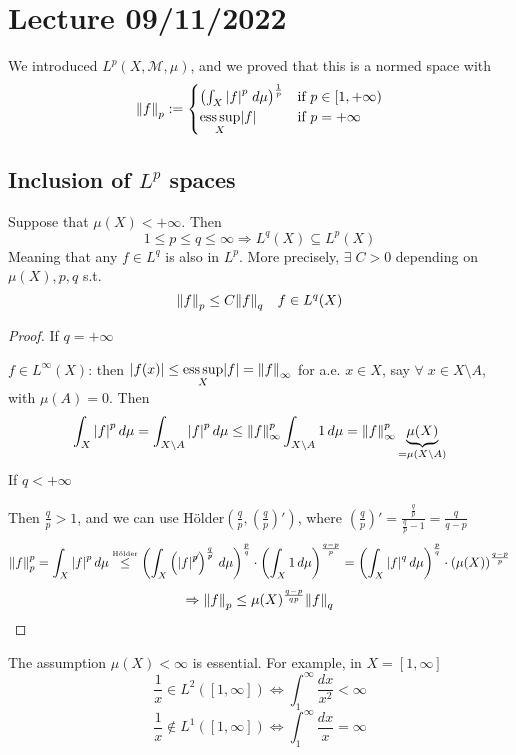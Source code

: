 \section{Lecture 09/11/2022}
We introduced \(L^p(X, \mathcal{M}, \mu)\), and we proved that this is a normed space with 
\[
    \norm{f}_p := \begin{cases}
        \left( \int_X \abs{f}^p \; d\mu \right)^{\frac{1}{p}} & \text{if } p\in [1, +\infty) \\
        \underset{X}{\text{ess}\, \text{sup}}\abs{f} & \text{if } p = +\infty
    \end{cases}
\]
\subsection*{Inclusion of \(L^p\) spaces}
\begin{theorem}
    Suppose that \(\mu(X) < +\infty\). Then 
    \[
        1 \leq p \leq q \leq \infty \Rightarrow L^q(X) \subseteq L^p(X)
    \]
    Meaning that any \(f \in L^q\) is also in \(L^p\). More precisely, \(\exists \; C > 0\) depending on \(\mu(X), p, q\) s.t.
    \[
        \norm{f}_p \leq C \norm{f}_q \quad f \in L^q(X)
    \]
\end{theorem}
\begin{proof}
    If \(q = +\infty\)
    
    \(f \in L^\infty(X)\): then \(\abs{f(x)} \leq \underset{X}{\text{ess}\, \text{sup}}\abs{f} = \norm{f}_\infty\) for a.e. \(x \in X\), say \(\forall \; x \in X \setminus A\), with \(\mu(A) = 0\). Then 
    \[
        \int_X \abs{f}^p \, d\mu = \int_{X\setminus A} \abs{f}^p \, d\mu \leq \norm{f}_{\infty}^p \int_{X\setminus A} 1 \,d\mu = \norm{f}_\infty^p \underbrace{\mu(X)}_{= \mu(X\setminus A)}
    \]
    If \(q < +\infty\)

    Then \(\frac{q}{p} > 1\), and we can use Hölder\(\left(\frac{q}{p},\left( \frac{q}{p} \right)' \right)\), where \(\left( \frac{q}{p} \right)' = \frac{\frac{q}{p}}{\frac{q}{p}-1} = \frac{q}{q-p}\)
    \[
        \norm{f}_p^p = \int_X \abs{f}^p \, d\mu \overset{\text{\tiny{Hölder}}}{\leq} \left( \int_X \left( \abs{f}^{\not p} \right)^{\frac{q}{\not p}} \, d\mu\right)^{\frac{p}{q}}\cdot \left( \int_X 1 \, d\mu \right)^{\frac{q-p}{p}} = \left( \int_X \abs{f}^{q} \, d\mu\right)^{\frac{p}{q}}\cdot \left( \mu(X)\right)^{\frac{q-p}{p}}
    \]
    \[
        \Rightarrow \norm{f}_p \leq \mu(X)^{\frac{q-p}{qp}} \norm{f}_q
    \]
\end{proof}

The assumption \(\mu(X)< \infty\) is essential. For example, in \(X = [1, \infty]\)
\[
    \frac{1}{x} \in L^2([1, \infty]) \Leftrightarrow \int_1^\infty \frac{dx}{x^2} < \infty
\]
\[
    \frac{1}{x} \notin L^1 ([1, \infty]) \Leftrightarrow \int_1^\infty \frac{dx}{x} = \infty
\]

